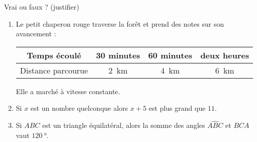 
\begin{exercice}\label{exo2smath-0251}

    Vrai ou faux ? (justifier)
    \begin{enumerate}
        \item
            Le petit chaperon rouge traverse la forêt et prend des notes sur son avancement :
            \begin{center}
                \begin{tabular}[]{|c||c|c|c|}
                    \hline
                    Temps écoulé&30 minutes&60 minutes&deux heures\\
                    \hline
                    Distance parcourue&\SI{2}{\kilo\meter}&\SI{4}{\kilo\meter}&\SI{6}{\kilo\meter}\\ 
                    \hline
                \end{tabular}
            \end{center}
            Elle a marché à vitesse constante.
        \item
            Si \( x\) est un nombre quelconque alors \( x+5\) est plus grand que \( 11\).
        \item
            Si \( ABC\) est un triangle équilatéral, alors la somme des angles \( \widehat{ABC}\) et \( \widehat{BCA}\) vaut \(\SI{120}{\degree}\).
    \end{enumerate}

\end{exercice}
